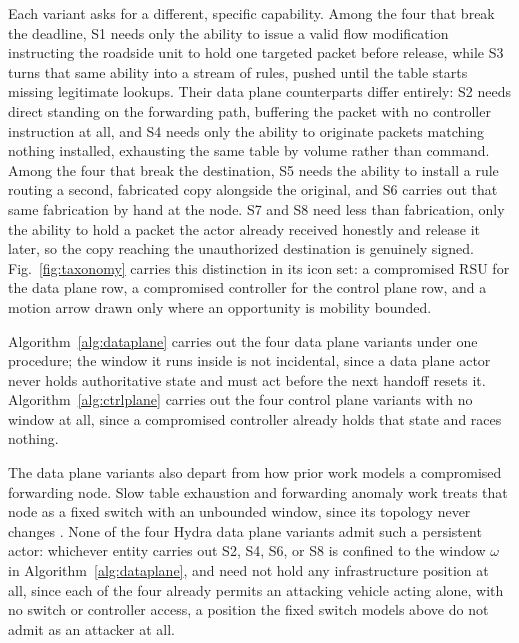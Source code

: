 \documentclass[lettersize,journal]{IEEEtran}
\begin{document}
Each variant asks for a different, specific capability. Among the four that break the deadline, S1 needs only the ability to issue a valid flow modification instructing the roadside unit to hold one targeted packet before release, while S3 turns that same ability into a stream of rules, pushed until the table starts missing legitimate lookups. Their data plane counterparts differ entirely: S2 needs direct standing on the forwarding path, buffering the packet with no controller instruction at all, and S4 needs only the ability to originate packets matching nothing installed, exhausting the same table by volume rather than command. Among the four that break the destination, S5 needs the ability to install a rule routing a second, fabricated copy alongside the original, and S6 carries out that same fabrication by hand at the node. S7 and S8 need less than fabrication, only the ability to hold a packet the actor already received honestly and release it later, so the copy reaching the unauthorized destination is genuinely signed. Fig.~\ref{fig:taxonomy} carries this distinction in its icon set: a compromised RSU for the data plane row, a compromised controller for the control plane row, and a motion arrow drawn only where an opportunity is mobility bounded.

Algorithm~\ref{alg:dataplane} carries out the four data plane variants under one procedure; the window it runs inside is not incidental, since a data plane actor never holds authoritative state and must act before the next handoff resets it. Algorithm~\ref{alg:ctrlplane} carries out the four control plane variants with no window at all, since a compromised controller already holds that state and races nothing.

The data plane variants also depart from how prior work models a compromised forwarding node. Slow table exhaustion and forwarding anomaly work treats that node as a fixed switch with an unbounded window, since its topology never changes \cite{pascoal2017tap,sfto2023,fade2016,sdnsec2016}. None of the four Hydra data plane variants admit such a persistent actor: whichever entity carries out S2, S4, S6, or S8 is confined to the window $\omega$ in Algorithm~\ref{alg:dataplane}, and need not hold any infrastructure position at all, since each of the four already permits an attacking vehicle acting alone, with no switch or controller access, a position the fixed switch models above do not admit as an attacker at all.
\end{document}
